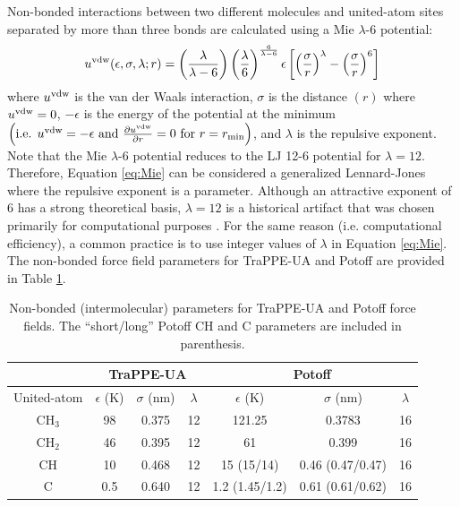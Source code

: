 \documentclass[journal=jctc,manuscript=article]{achemso}
\begin{document}
Non-bonded interactions between two different molecules and united-atom sites separated by more than three bonds are calculated using a Mie $\lambda$-6 potential:
\begin{equation} \label{eq:Mie}
u^{\rm vdw}(\epsilon,\sigma,\lambda;r) = \left(\frac{\lambda}{\lambda - 6}\right)\left(\frac{\lambda}{6}\right)^{\frac{6}{\lambda - 6}} \epsilon \left[\left(\frac{\sigma}{r}\right)^\lambda - \left(\frac{\sigma}{r}\right)^6\right]
\end{equation} 
where $u^{\rm vdw}$ is the van der Waals interaction, $\sigma$ is the distance $(r)$ where $u^{\rm vdw} = 0$, $-\epsilon$ is the energy of the potential at the minimum $\left(\text{i.e. }u^{\rm vdw} = -\epsilon \text{ and } \frac{\partial u^{\rm vdw}}{\partial r} = 0 \text{ for } r=r_{\rm min} \right)$, and $\lambda$ is the repulsive exponent. Note that the Mie $\lambda$-6 potential reduces to the LJ 12-6 potential for $\lambda = 12$. Therefore, Equation \ref{eq:Mie} can be considered a generalized Lennard-Jones where the repulsive exponent is a parameter. Although an attractive exponent of 6 has a strong theoretical basis, $\lambda = 12$ is a historical artifact that was chosen primarily for computational purposes \cite{Allen1987}. For the same reason (i.e. computational efficiency), a common practice is to use integer values of $\lambda$ in Equation \ref{eq:Mie}. The non-bonded force field parameters for TraPPE-UA and Potoff are provided in Table \ref{tab:nonbonded params}.

\begin{table}[h!]
	\caption{Non-bonded (intermolecular) parameters for TraPPE-UA and Potoff force fields. The ``short/long'' Potoff CH and C parameters are included in parenthesis.} \label{tab:nonbonded params}
	\begin{center}
		\begin{tabular}{|c|c|c|c|c|c|c|}
			\hline
			\multicolumn{1}{|c}{} & \multicolumn{3}{|c}{TraPPE-UA} & \multicolumn{3}{|c|}{Potoff} \\ \hline
			United-atom & $\epsilon$ (K) & $\sigma$ (nm) & $\lambda$ & $\epsilon$ (K) & $\sigma$ (nm) & $\lambda$ \\ \hline
			CH$_3$ & 98 & 0.375 & 12 & 121.25 & 0.3783 & 16  \\ 
			CH$_2$ & 46 & 0.395 & 12 & 61 & 0.399 & 16 \\ 
			CH & 10 & 0.468 & 12 & 15 (15/14) & 0.46 (0.47/0.47) & 16 \\
			C & 0.5 & 0.640 & 12 & 1.2 (1.45/1.2) & 0.61 (0.61/0.62) & 16 \\
			\hline
		\end{tabular}
	\end{center} 
\end{table}
\end{document}
